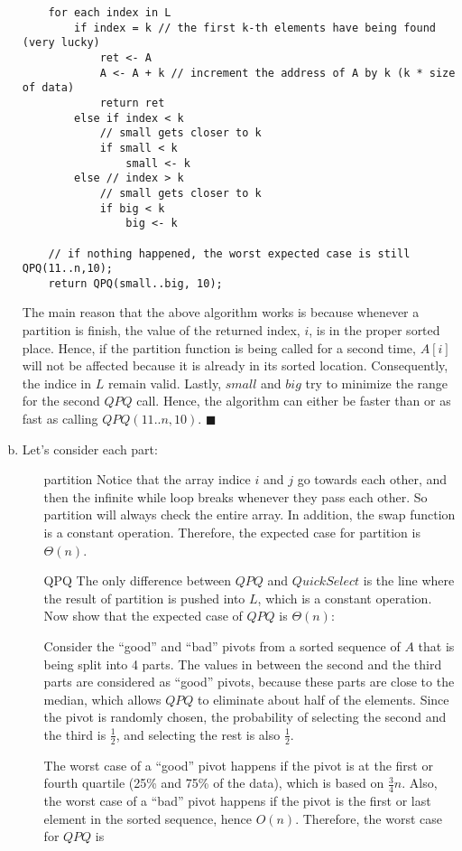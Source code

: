 \documentclass[12pt]{article}
\begin{document}
\begin{enumerate}[(a)]
\begin{lstlisting}
	for each index in L
		if index = k // the first k-th elements have being found (very lucky)
			ret <- A
			A <- A + k // increment the address of A by k (k * size of data)
			return ret
		else if index < k
			// small gets closer to k
			if small < k
				small <- k
		else // index > k
			// small gets closer to k
			if big < k
				big <- k

	// if nothing happened, the worst expected case is still QPQ(11..n,10);
	return QPQ(small..big, 10);
\end{lstlisting}
The main reason that the above algorithm works is because whenever a partition is finish, the value of the returned index, $i$, is in the proper sorted place.
Hence, if the partition function is being called for a second time, $A[i]$ will not be affected because it is already in its sorted location. Consequently, the indice in $L$ remain valid.
Lastly, $small$ and $big$ try to minimize the range for the second $QPQ$ call.
Hence, the algorithm can either be faster than or as fast as calling $QPQ(11..n,10)$.
\hfill $\blacksquare$

\item
Let's consider each part:
\begin{itemize}
\item[partition]
Notice that the array indice $i$ and $j$ go towards each other, and then the infinite while loop breaks whenever they pass each other.
So partition will always check the entire array.
In addition, the swap function is a constant operation. Therefore, the expected case for partition is $\Theta(n)$.
\item[QPQ]
The only difference between $QPQ$ and $QuickSelect$ is the line where the result of partition is pushed into $L$, which is a constant operation.
Now show that the expected case of $QPQ$ is $\Theta(n)$:

Consider the ``good'' and ``bad'' pivots from a sorted sequence of $A$ that is being split into 4 parts.
The values in between the second and the third parts are considered as ``good'' pivots, because these parts are close to the median, which allows $QPQ$ to eliminate about half of the elements.
Since the pivot is randomly chosen, the probability of selecting the second and the third is $\frac{1}{2}$, and selecting the rest is also $\frac{1}{2}$.

The worst case of a ``good'' pivot happens if the pivot is at the first or fourth quartile (25\% and 75\% of the data), which is based on $\frac{3}{4}n$.
Also, the worst case of a ``bad'' pivot happens if the pivot is the first or last element in the sorted sequence, hence $O(n)$.
Therefore, the worst case for $QPQ$ is


\end{itemize}
\end{enumerate}
\end{document}

